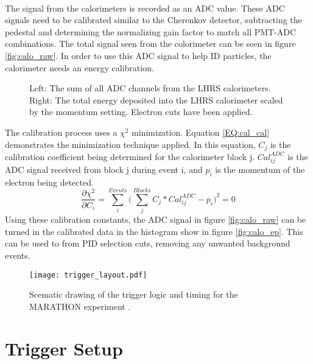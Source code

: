 	\paragraph{} The signal from the calorimeters is recorded as an ADC value. These ADC signals need to be calibrated similar to the Cherenkov detector, subtracting the pedestal and determining the normalizing gain factor to match all PMT-ADC combinations. The total signal seen from the colorimeter can be seen in figure \ref{fig:calo_raw}. In order to use this ADC signal to help ID particles, the calorimeter needs an energy calibration. 
	\begin{figure}[t]
		\centering
		\centering	
		\caption{Left: The sum of all ADC channels from the LHRS calorimeters. Right: The total energy deposited into the LHRS calorimeter scaled by the momentum setting. Electron cuts have been applied.}
	\end{figure}
	The calibration process uses a $\chi^2$ minimization. Equation \ref{EQ:cal_cal} demonstrates the minimization technique applied. In this equation, $C_j$ is the calibration coefficient being determined for the calorimeter block j. $Cal^{ADC}_{ij}$ is the ADC signal received from block j during event i, and $p_i$ is the momentum of the electron being detected. 
	\begin{equation}
		\frac{\partial\chi^2}{\partial C_i} = \sum\limits_{i}^{Events} \bigg( \sum\limits_{j}^{Blocks}C_{j}*Cal^{ADC}_{ij} - p_i  \bigg)^2 = 0 
		\label{EQ:cal_cal}
	\end{equation}
	Using these calibration constants, the ADC signal in figure \ref{fig:calo_raw} can be turned in the calibrated data in the histogram show in figure \ref{fig:calo_ep}. This can be used to from PID selection cuts, removing any unwanted background events.  
	
\begin{figure}[t]
	\centering
	\texttt{[image: trigger\_layout.pdf]}
	\caption{Scematic drawing of the trigger logic and timing for the MARATHON experiment \cite{flo_trig}.}
	\label{fig:trig_layout}
\end{figure}	
	
\section{Trigger Setup}\label{sec:Trig}
